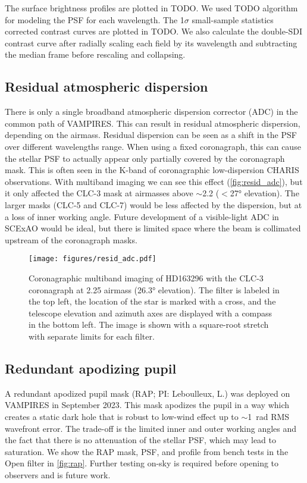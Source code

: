 The surface brightness profiles are plotted in TODO. We used TODO algorithm for modeling the PSF for each wavelength. The 1$\sigma$ small-sample statistics corrected contrast curves \citep{mawet_fundamental_2014} are plotted in TODO. We also calculate the double-SDI contrast curve after radially scaling each field by its wavelength and subtracting the median frame before rescaling and collapsing.

\subsection{Residual atmospheric dispersion}

There is only a single broadband atmospheric dispersion corrector (ADC) in the common path of VAMPIRES. This can result in residual atmospheric dispersion, depending on the airmass. Residual dispersion can be seen as a shift in the PSF over different wavelengths range. When using a fixed coronagraph, this can cause the stellar PSF to actually appear only partially covered by the coronagraph mask. This is often seen in the K-band of coronagraphic low-dispersion CHARIS observations. With multiband imaging we can see this effect (\autoref{fig:resid_adc}), but it only affected the CLC-3 mask at airmasses above $\sim$\num{2.2} ($<$\ang{27} elevation). The larger masks (CLC-5 and CLC-7) would be less affected by the dispersion, but at a loss of inner working angle. Future development of a visible-light ADC in SCExAO would be ideal, but there is limited space where the beam is collimated upstream of the coronagraph masks.

\begin{figure}
    \centering
    \texttt{[image: figures/resid\_adc.pdf]}
    \caption{Coronagraphic multiband imaging of HD163296 with the CLC-3 coronagraph at 2.25 airmass (\ang{26.3} elevation). The filter is labeled in the top left, the location of the star is marked with a cross, and the telescope elevation and azimuth axes are displayed with a compass in the bottom left. The image is shown with a square-root stretch with separate limits for each filter.\label{fig:resid_adc}}
\end{figure}

\subsection{Redundant apodizing pupil}

A redundant apodized pupil mask (RAP; PI: Leboulleux, L.) was deployed on VAMPIRES in September 2023. This mask apodizes the pupil in a way which creates a static dark hole that is robust to low-wind effect up to $\sim$\SI{1}{rad} RMS wavefront error. The trade-off is the limited inner and outer working angles and the fact that there is no attenuation of the stellar PSF, which may lead to saturation. We show the RAP mask, PSF, and profile from bench tests in the Open filter in \autoref{fig:rap}. Further testing on-sky is required before opening to observers and is future work.

